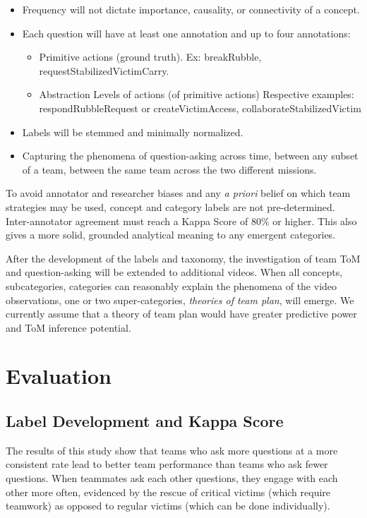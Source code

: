 \begin{itemize}
    \item Frequency will not dictate importance, causality, or connectivity of
        a concept.
    \item Each question will have at least one annotation and up to four
      annotations:
    \begin{itemize}
        \item Primitive actions (ground truth). Ex: breakRubble,
          requestStabilizedVictimCarry.
        \item Abstraction Levels of actions (of primitive actions) Respective
          examples: respondRubbleRequest or createVictimAccess, collaborateStabilizedVictim
    \end{itemize}
    \item Labels will be stemmed and minimally normalized.
    \item Capturing the phenomena of question-asking across time, between any subset of a team, between the same team across the two different missions.
\end{itemize}


To avoid annotator and researcher biases and any \emph{a priori} belief on
which team strategies may be used, concept and category labels are not
pre-determined. Inter-annotator agreement must reach a Kappa Score of 80\% or
higher. This also gives a more solid, grounded analytical meaning to any
emergent categories.

After the development of the labels and taxonomy, the investigation of team ToM
and question-asking will be extended to additional videos. When all concepts,
subcategories, categories can reasonably explain the phenomena of the video
observations, one or two super-categories, \emph{theories of team plan}, will
emerge. We currently assume that a theory of team plan would have greater
predictive power and ToM inference potential.


\section{Evaluation}
\label{sec:question_plan_eval}

\subsection{Label Development and Kappa Score}

The results of this study show that teams who ask more questions at a more
consistent rate lead to better team performance than teams who ask fewer
questions. When teammates ask each other questions, they engage with each other
more often, evidenced by the rescue of critical victims (which require
teamwork) as opposed to regular victims (which can be done individually).

